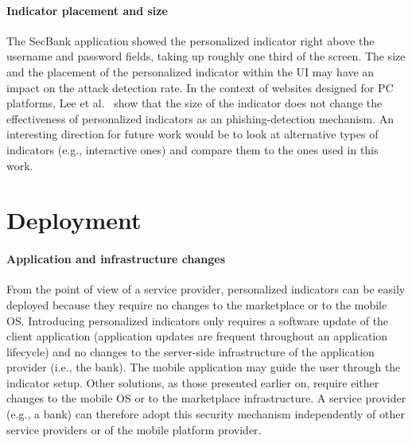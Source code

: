 \paragraph{Indicator placement and size}
The SecBank application showed the personalized indicator right above the username and password fields, taking up roughly one third of the screen.
The size and the placement of the personalized indicator within the UI may have an impact on the attack detection rate.
In the context of websites designed for PC platforms, Lee et al.~\cite{lee-w2sp14} show that the size of the indicator does not change the effectiveness of personalized indicators as an phishing-detection mechanism.
An interesting direction for future work would be to look at alternative types of indicators (e.g., interactive ones) and compare them to the ones used in this work.

\section{Deployment}
\label{sec:sp_phishing_deployment}


\paragraph{Application and infrastructure changes}
From the point of view of a service provider, personalized indicators can be easily deployed because they require no changes to the marketplace or to the mobile OS.
Introducing personalized indicators only requires a software update of the client application (application updates are frequent throughout an application lifecycle) and no changes to the server-side infrastructure of the application provider (i.e., the bank). 
The mobile application may guide the user through the indicator setup. 
Other solutions, as those presented earlier on, require either changes to the mobile OS or to the marketplace infrastructure. 
A service provider (e.g., a bank) can therefore adopt this security mechanism independently of other service providers or of the mobile platform provider.


